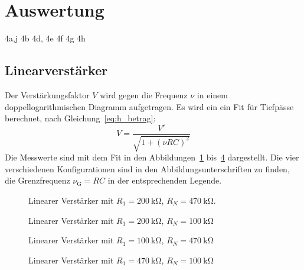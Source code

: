 \section{Auswertung}%
\label{sec:auswertung}
4a,j
4b
4d, 4e
4f
4g
4h
\subsection{Linearverst\"arker}
Der Verstärkungsfaktor $V$ wird gegen die Frequenz $\nu$ in einem doppellogarithmischen Diagramm aufgetragen.
Es wird ein ein Fit für Tiefpässe berechnet, nach Gleichung~\eqref{eq:h_betrag}:
\begin{equation}
  V = \frac{V'}{\sqrt{1 + {\left(\nu RC\right)}^{2}}}
\end{equation}
Die Messwerte sind mit dem Fit in den Abbildungen~\ref{fig:lin_verst_01} bis~\ref{fig:lin_verst_04} dargestellt.
Die vier verschiedenen Konfigurationen sind in den Abbildungsunterschriften zu finden,
die Grenzfrequenz $\nu_\text{G} = RC$ in der entsprechenden Legende.

\begin{figure}[ht]
  \centering
  
  \caption{Linearer Verst\"arker mit $R_1 = \SI{200}{\kilo\ohm}$, $R_N = \SI{470}{\kilo\ohm}$.}
  \label{fig:lin_verst_01}
\end{figure}

\begin{figure}[ht]
  \centering
  
  \caption{Linearer Verst\"arker mit $R_1 = \SI{200}{\kilo\ohm}$, $R_N = \SI{100}{\kilo\ohm}$}
  \label{fig:lin_verst_02}
\end{figure}

\begin{figure}[ht]
  \centering
  
  \caption{Linearer Verst\"arker mit $R_1 = \SI{100}{\kilo\ohm}$, $R_N = \SI{470}{\kilo\ohm}$}
  \label{fig:lin_verst_03}
\end{figure}

\begin{figure}[ht]
  \centering
  
  \caption{Linearer Verst\"arker mit $R_1 = \SI{470}{\kilo\ohm}$, $R_N = \SI{100}{\kilo\ohm}$}
  \label{fig:lin_verst_04}
\end{figure}

